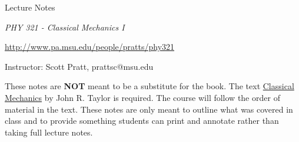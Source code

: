 







\pagestyle{empty}

\centerline{\Large Lecture Notes}

\bigskip

\centerline{\it\Large PHY 321 - Classical Mechanics I}

\centerline{\href{http://www.pa.msu.edu/people/pratts/phy321}{http://www.pa.msu.edu/people/pratts/phy321}}
\medskip
\centerline{\large Instructor: Scott Pratt, prattsc@msu.edu}


\medskip

These notes are {\bf NOT} meant to be a substitute for the book. The text \href{http://www.amazon.com/Classical-Mechanics-John-R-Taylor/dp/189138922X}{Classical Mechanics} by John R. Taylor is required. The course will follow the order of material in the text. These notes are only meant to outline what was covered in class and to provide something students can print and annotate rather than taking full lecture notes.

\tableofcontents

\newpage

\pagestyle{fancy}

\setcounter{page}{1} 
\setcounter{section}{0}

\setcounter{examplecounter}{0}

\newpage

\setcounter{examplecounter}{0}

\newpage

\setcounter{examplecounter}{0}

\newpage

\setcounter{examplecounter}{0}

\newpage

\setcounter{examplecounter}{0}

\newpage

\setcounter{examplecounter}{0}



